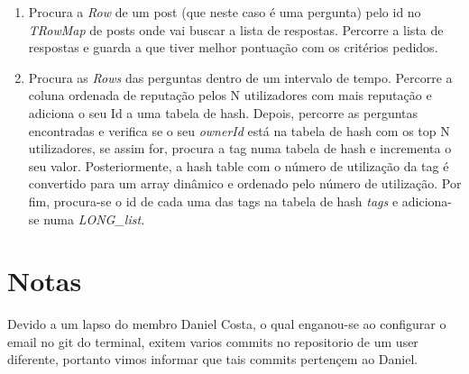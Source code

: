 \documentclass[a4paper, 10pt]{article}
\begin{document}
\begin{enumerate}
	\item Procura a \emph{Row} de um post (que neste caso é uma pergunta) pelo id no \emph{TRowMap} de posts onde vai buscar a lista de respostas. Percorre a lista de respostas e guarda a que tiver melhor pontuação com os critérios pedidos.

	\item Procura as \emph{Rows} das perguntas dentro de um intervalo de tempo. Percorre a coluna ordenada de reputação pelos N utilizadores com mais reputação e adiciona o seu Id a uma tabela de hash. Depois, percorre as perguntas encontradas e verifica se o seu \emph{ownerId} está na tabela de hash com os top N utilizadores, se assim for, procura a tag numa tabela de hash e incrementa o seu valor. Posteriormente, a hash table com o número de utilização da tag é convertido para um array dinâmico e ordenado pelo número de utilização. Por fim, procura-se o id de cada uma das tags na tabela de hash \emph{tags} e adiciona-se numa \emph{LONG\_list}.

\end{enumerate}

\section{Notas}
\label{sec:notas}

Devido a um lapso do membro Daniel Costa, o qual enganou-se ao configurar o email no git do terminal, exitem varios commits no repositorio de um user diferente, portanto vimos informar que tais commits pertençem ao Daniel.
\end{document}
